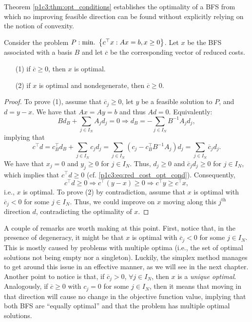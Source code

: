 Theorem \ref{p1c3:thm:opt_conditions} establishes the optimality of a BFS from which no improving feasible direction can be found without explicitly relying on the notion of convexity.

\begin{theorem}\label{p1c3:thm:opt_conditions}
	Consider the problem $P : \mathop{\text{min.~}}\left\{ c^\top x : Ax = b, x \geq 0 \right \}$. Let $x$ be the BFS associated with a basis $B$ and let $\overline{c}$ be the corresponding vector of reduced costs.
	\begin{enumerate}
		\item[(1)] if $\overline{c} \geq 0$, then $x$ is optimal.
		\item[(2)] if $x$ is optimal and nondegenerate, then $\overline{c} \geq 0$.	
	\end{enumerate}
\end{theorem}

\begin{proof}
To prove (1), assume that $\overline{c}_j \geq 0$, let $y$ be a feasible solution to $P$, and $d = y - x$. We have that $Ax = Ay = b$ and thus $Ad = 0$. Equivalently:
%
\begin{equation*}
	B d_B + \sum_{j \in I_N}A_j d_j = 0 \Rightarrow d_B = - \sum_{j \in I_N}B^{-1}A_jd_j,
\end{equation*}
%	
implying that	
%
\begin{equation} \label{p1c3:eq:red_cost_opt_cond}
	c^\top d = c_B^\top d_B + \sum_{j \in I_N}c_jd_j= \sum_{j \in I_N} (c_j - c_B^\top B^{-1}A_j)d_j = \sum_{j \in I_N}\overline{c}_jd_j. 
\end{equation}
%
We have that $x_j = 0$ and $y_j \geq 0$	for $j \in I_N$. Thus, $d_j \geq 0$ and $\overline{c}_jd_j \geq 0$ for $j \in I_N$, which implies that $c^\top d \geq 0$ (cf. \eqref{p1c3:eq:red_cost_opt_cond}). Consequently,
%
\begin{equation*}
	c^\top d \geq 0 \Rightarrow	c^\top (y - x) \geq 0 \Rightarrow c^\top y \geq c^\top x,
\end{equation*}
%
i.e., $x$ is optimal. To prove (2) by contradiction, assume that $x$ is optimal with $\overline{c}_j < 0$ for some $j \in I_N$. Thus, we could improve on $x$ moving along this $j^\text{th}$ direction $d$, contradicting the optimality of $x$.
\end{proof}

A couple of remarks are worth making at this point. First, notice that, in the presence of degeneracy, it might be that $x$ is optimal with $\overline{c}_j < 0$ for some $j \in I_N$. This is mostly caused by problems with multiple optima (i.e., the set of optimal solutions not being empty nor a singleton). Luckily, the simplex method manages to get around this issue in an effective manner, as we will see in the next chapter. Another point to notice is that, if $\overline{c}_j > 0$, $\forall j \in I_N$, then $x$ is a \emph{unique optimal}. Analogously, if $\overline{c} \geq 0$ with $c_j =0$ for some $j \in I_N$, then it means that moving in that direction will cause no change in the objective function value, implying that both BFS are ``equally optimal'' and that the problem has multiple optimal solutions. 

